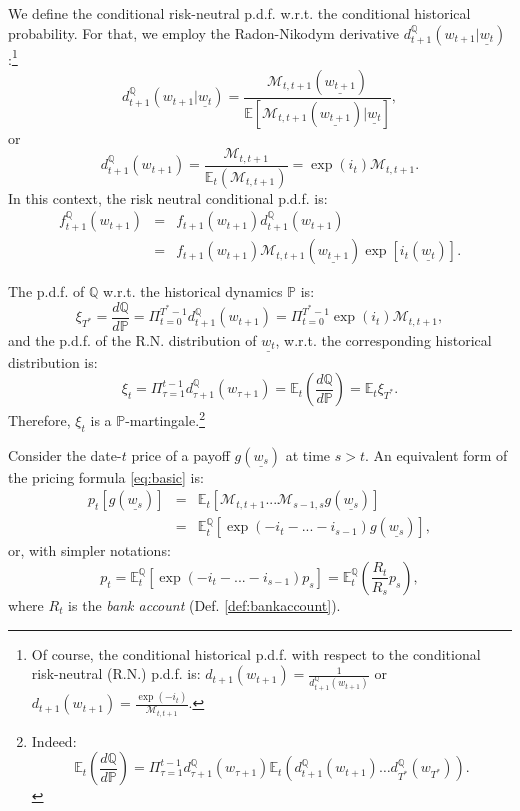 \documentclass[
  12pt,
]{book}
\theoremstyle{definition}
\theoremstyle{definition}
\theoremstyle{definition}
\theoremstyle{definition}
\theoremstyle{remark}
\begin{document}
We define the conditional risk-neutral p.d.f. w.r.t. the conditional historical probability. For that, we employ the Radon-Nikodym derivative \(d^{\mathbb{Q}}_{t+1}(w_{t+1}|\underline{w_t})\):\footnote{Of course, the conditional historical p.d.f. with respect to the conditional risk-neutral (R.N.) p.d.f. is:
  \(d_{t+1}(w_{t+1}) = \frac{1}{d^{\mathbb{Q}}_{t+1}(w_{t+1})}\) or \(d_{t+1}(w_{t+1}) = \frac{\exp(-i_{t})}{\mathcal{M}_{t,t+1}}\).}
\[
d^{\mathbb{Q}}_{t+1}(w_{t+1}|\underline{w_t}) =
\frac{\mathcal{M}_{t,t+1}(\underline{w_{t+1}})}{\mathbb{E}[\mathcal{M}_{t,t+1}(\underline{w_{t+1}})|\underline{w_t}]},
\]
or
\[
d^{\mathbb{Q}}_{t+1}(w_{t+1})=
\frac{\mathcal{M}_{t,t+1}}{\mathbb{E}_t(\mathcal{M}_{t,t+1})}=\exp(i_{t}) \mathcal{M}_{t,t+1}.
\]
In this context, the risk neutral conditional p.d.f. is:
\begin{eqnarray}
f^{\mathbb{Q}}_{t+1}(w_{t+1}) &=& f_{t+1}(w_{t+1})d^{\mathbb{Q}}_{t+1}(w_{t+1}) \nonumber \\
&=&f_{t+1} (w_{t+1}) \mathcal{M}_{t,t+1} (\underline{w_{t+1}}) \exp [i_{t} (\underline{w_t})].\label{eq:fQfP}
\end{eqnarray}

The p.d.f. of \(\mathbb{Q}\) w.r.t. the historical dynamics \(\mathbb{P}\) is:
\[
\xi_{T^*} =  \frac{d\mathbb{Q}}{d\mathbb{P}} =
\Pi^{T^{*}-1}_{t=0} d^{\mathbb{Q}}_{t+1}(w_{t+1}) =
\Pi^{T^{*}-1}_{t=0} \exp(i_{t}) \mathcal{M}_{t,t+1},
\]
and the p.d.f. of the R.N. distribution of \(\underline{w_t}\), w.r.t. the corresponding historical distribution is:
\[
\xi_t= \Pi^{t-1}_{\tau=1}
d^{\mathbb{Q}}_{\tau+1}(w_{\tau+1})=\mathbb{E}_t\left(\frac{d\mathbb{Q}}{d\mathbb{P}}\right) = \mathbb{E}_t\xi_{T^*}.
\]
Therefore, \(\xi_t\) is a \(\mathbb{P}\)-martingale.\footnote{Indeed:
  \[
  \mathbb{E}_t \left( \frac{d\mathbb{Q}}{d\mathbb{P}}\right) = \Pi^{t-1}_{\tau = 1} d^{\mathbb{Q}}_{\tau + 1} (w_{\tau+1}) \mathbb{E}_t \left( d^{\mathbb{Q}}_{t+1} (w_{t+1}) \ldots d^{\mathbb{Q}}_{T^*} (w_{T^*})\right).
  \]}

Consider the date-\(t\) price of a payoff \(g(\underline{w_s})\) at time \(s>t\). An equivalent form of the pricing formula \eqref{eq:basic} is:
\begin{eqnarray*}
p_t[g(\underline{w_s})] &=& \mathbb{E}_t[\mathcal{M}_{t,t+1}...\mathcal{M}_{s-1,s}g(\underline{w_s})] \\
&=& \mathbb{E}^{\mathbb{Q}}_t[\exp(-i_{t}-...-i_{s-1})g(\underline{w_s})],
\end{eqnarray*}
or, with simpler notations:
\[
p_t = \mathbb{E}^{\mathbb{Q}}_t[\exp(-i_{t}-...-i_{s-1})p_s] = \mathbb{E}^{\mathbb{Q}}_t\left(\frac{R_t}{R_s} p_s\right),
\]
where \(R_t\) is the \emph{bank account} (Def. \ref{def:bankaccount}).
\end{document}
